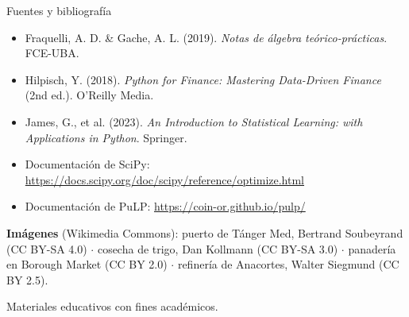 \documentclass[aspectratio=169,10pt]{beamer}
\begin{document}
\begin{frame}{Fuentes y bibliografía}

\begin{itemize}
    \item Fraquelli, A. D. \& Gache, A. L. (2019). \textit{Notas de álgebra teórico-prácticas}. FCE-UBA.
    \item Hilpisch, Y. (2018). \textit{Python for Finance: Mastering Data-Driven Finance} (2nd ed.). O'Reilly Media.
    \item James, G., et al. (2023). \textit{An Introduction to Statistical Learning: with Applications in Python}. Springer.
    \item Documentación de SciPy: \url{https://docs.scipy.org/doc/scipy/reference/optimize.html}
    \item Documentación de PuLP: \url{https://coin-or.github.io/pulp/}
\end{itemize}

\vspace{0.3cm}

{\scriptsize \textbf{Imágenes} (Wikimedia Commons): puerto de Tánger Med, Bertrand Soubeyrand
(CC BY-SA 4.0) $\cdot$ cosecha de trigo, Dan Kollmann (CC BY-SA 3.0) $\cdot$ panadería en Borough
Market (CC BY 2.0) $\cdot$ refinería de Anacortes, Walter Siegmund (CC BY 2.5).}

\vspace{0.3cm}

\begin{center}
\small
Materiales educativos con fines académicos.
\end{center}

\end{frame}
\end{document}
